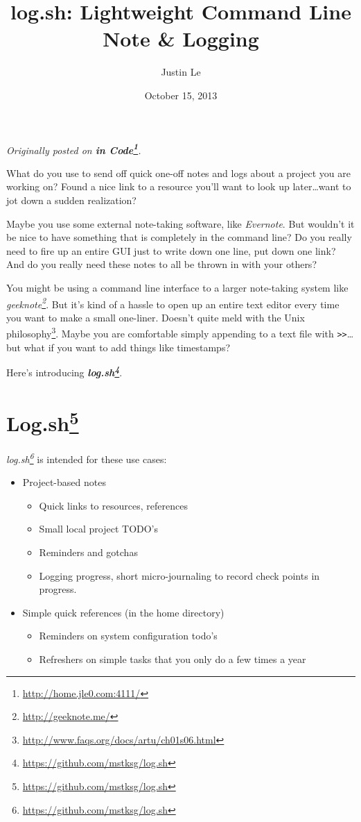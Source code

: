 \documentclass[]{article}
\title{log.sh: Lightweight Command Line Note \& Logging}
\author{Justin Le}
\date{October 15, 2013}
\renewcommand{\href}[2]{#2\footnote{\url{#1}}}
\begin{document}
\maketitle

\emph{Originally posted on \textbf{\href{http://home.jle0.com:4111/}{in
Code}}.}

What do you use to send off quick one-off notes and logs about a project
you are working on? Found a nice link to a resource you'll want to look
up later\ldots{}want to jot down a sudden realization?

Maybe you use some external note-taking software, like \emph{Evernote}.
But wouldn't it be nice to have something that is completely in the
command line? Do you really need to fire up an entire GUI just to write
down one line, put down one link? And do you really need these notes to
all be thrown in with your others?

You might be using a command line interface to a larger note-taking
system like \emph{\href{http://geeknote.me/}{geeknote}}. But it's kind
of a hassle to open up an entire text editor every time you want to make
a small one-liner. Doesn't quite meld with the
\href{http://www.faqs.org/docs/artu/ch01s06.html}{Unix philosophy}.
Maybe you are comfortable simply appending to a text file with
\texttt{\textgreater{}\textgreater{}}\ldots{}but what if you want to add
things like timestamps?

Here's introducing
\textbf{\emph{\href{https://github.com/mstksg/log.sh}{log.sh}}}.

\section{\texorpdfstring{\href{https://github.com/mstksg/log.sh}{Log.sh}}{Log.sh}}\label{log.shlog.sh}

\emph{\href{https://github.com/mstksg/log.sh}{log.sh}} is intended for
these use cases:

\begin{itemize}
\tightlist
\item
  Project-based notes

  \begin{itemize}
  \tightlist
  \item
    Quick links to resources, references
  \item
    Small local project TODO's
  \item
    Reminders and gotchas
  \item
    Logging progress, short micro-journaling to record check points in
    progress.
  \end{itemize}
\item
  Simple quick references (in the home directory)

  \begin{itemize}
  \tightlist
  \item
    Reminders on system configuration todo's
  \item
    Refreshers on simple tasks that you only do a few times a year
  \end{itemize}
\end{itemize}
\end{document}

